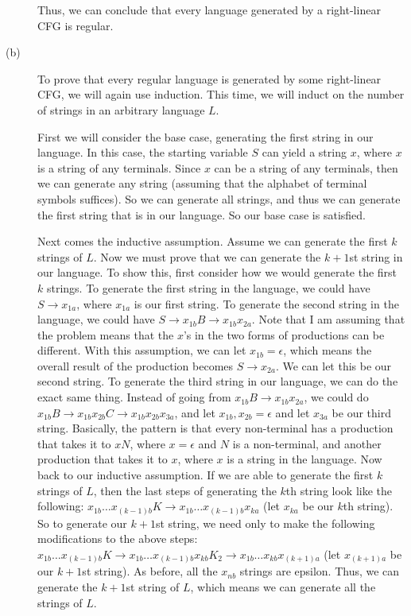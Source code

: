 \documentclass{article}
\begin{document}
\begin{description}
        Thus, we can conclude that every language generated by a right-linear
        CFG is regular.
    \item[(b)] To prove that every regular language is generated by some
        right-linear CFG, we will again use induction. This time, we will
        induct on the number of strings in an arbitrary language $L$.

        First we will consider the base case, generating the first string
        in our language. In this case, the starting variable $S$ can yield
        a string $x$, where $x$ is a string of any terminals. Since $x$ can
        be a string of any terminals, then we can generate any string (assuming
        that the alphabet of terminal symbols suffices). So we can generate all
        strings, and thus we can generate the first string that is in our
        language. So our base case is satisfied.

        Next comes the inductive assumption. Assume we can generate the first
        $k$ strings of $L$. Now we must prove that we can generate
        the $k + 1$st string in our language. To show this, first consider how
        we would generate the first $k$ strings. To generate the first
        string in the language, we could have $S \rightarrow x_{1a}$, where
        $x_{1a}$ is our first string. To generate
        the second string in the language, we could have
        $S \rightarrow x_{1b}B \rightarrow x_{1b}x_{2a}$. Note that I am
        assuming that the problem means that the $x$'s in the two forms of
        productions can be different. With this assumption, we can let
        $x_{1b} = \epsilon$, which means the overall result of the production
        becomes $S \rightarrow x_{2a}$. We can let this be our second string.
        To generate the third string in our language, we can do the exact same
        thing. Instead of going from $x_{1b}B \rightarrow x_{1b}x_{2a}$, we
        could do $x_{1b}B \rightarrow x_{1b}x_{2b}C \rightarrow x_{1b}x_{2b}
        x_{3a}$, and let $x_{1b},x_{2b} = \epsilon$ and let $x_{3a}$ be
        our third string. Basically, the pattern is that every non-terminal
        has a production that takes it to $xN$, where $x = \epsilon$ and
        $N$ is a non-terminal, and another production that takes it to
        $x$, where $x$ is a string in the language. Now back to our inductive
        assumption. If we are able to generate the first $k$ strings of $L$,
        then the last steps of generating the $k$th string look like the
        following: $x_{1b} \dots x_{(k-1)b}K \rightarrow
        x_{1b} \dots x_{(k-1)b}x_{ka}$ (let $x_{ka}$ be our $k$th string).
        So to generate our $k + 1$st string,
        we need only to make the following modifications to the above steps:
        $x_{1b} \dots x_{(k-1)b}K \rightarrow x_{1b} \dots x_{(k-1)b}x_{kb}
        K_{2} \rightarrow x_{1b} \dots x_{kb}x_{(k+1)a}$ (let $x_{(k+1)a}$ be
        our $k + 1$st string). As before, all the
        $x_{nb}$ strings are epsilon. Thus, we can generate the $k + 1$st
        string of $L$, which means we can generate all the strings of $L$.


\end{description}
\end{document}

